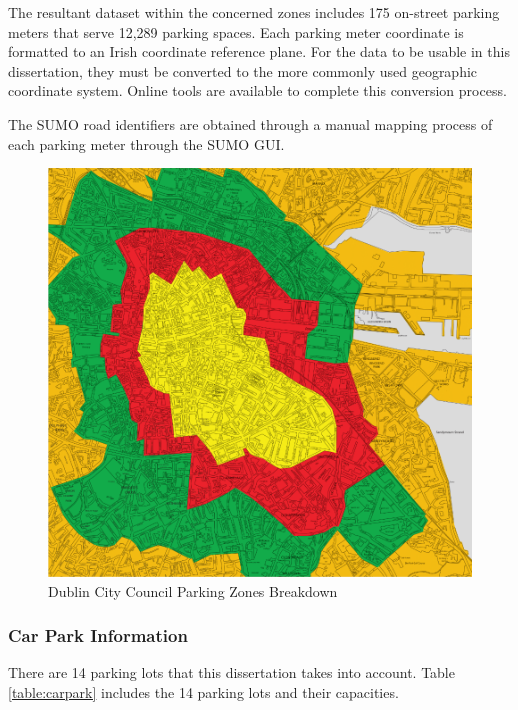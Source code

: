 The resultant dataset within the concerned zones includes 175 on-street parking meters that serve 12,289 parking spaces. Each parking meter coordinate is formatted to an Irish coordinate reference plane. For the data to be usable in this dissertation, they must be converted to the more commonly used geographic coordinate system. Online tools are available to complete this conversion process.

The SUMO road identifiers are obtained through a manual mapping process of each parking meter through the SUMO GUI.

\begin{figure}[H]
    \centering
    \includegraphics[width=\textwidth]{./Images/DUBLINZONES.PNG}
    \caption{Dublin City Council Parking Zones Breakdown \citep{DublinTariffs}}
    \label{fig:DUBLINZONES}
\end{figure}

\subsubsection{Car Park Information}\label{ssec:car_par_cap}
There are 14 parking lots that this dissertation takes into account. Table \ref{table:carpark} includes the 14 parking lots and their capacities.

